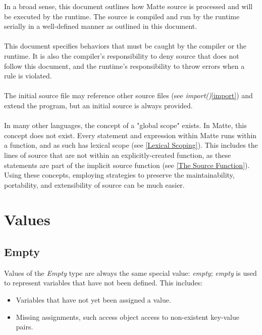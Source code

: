 \documentclass[12pt,letterpaper]{report}
\begin{document}
In a broad sense, this document outlines how Matte source is processed and will be 
executed by the runtime. The source is compiled and run by the runtime serially 
in a well-defined manner as outlined in this document. 
\\\\
This document specifies behaviors that must be caught by the compiler or the 
runtime. It is also the compiler's responsibility to deny source that does not 
follow this document, and the runtime's responsibility to throw errors when 
a rule is violated.
\\\\
The initial source file may reference other source files (see \textit{import()}\autoref{import}) 
and extend the program, but an initial source is always provided.
\\\\
In many other languages, the concept of a "global scope" exists. In Matte, 
this concept does not exist. Every statement and expression within Matte 
runs within a function, and as such has lexical scope (see \autoref{Lexical Scoping}).
This includes the lines of source that are not within an explicitly-created
function, as these statements are part of the implicit source function 
(see \autoref{The Source Function}). Using these concepts, employing strategies 
to preserve the maintainability, portability, and extensibility of source can 
be much easier.





\chapter{Values}\label{Values}





\section{Empty}\label{Empty}

Values of the \textit{Empty} type are always the same special value: \textit{empty};
\textit{empty} is used to represent variables that have not been defined. This includes:

\begin{itemize}
  \item Variables that have not yet been assigned a value.
  \item Missing assignments, such access object access to non-existent key-value pairs.
\end{itemize}
\end{document}
